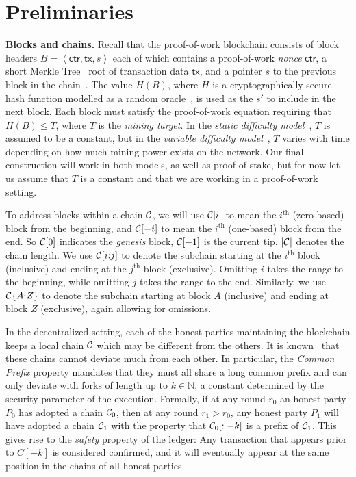 \section{Preliminaries}

\noindent
\textbf{Blocks and chains.}
Recall that
the proof-of-work blockchain consists of block headers $B = \left<\textsf{ctr}, \textsf{tx}, s\right>$ each of
which contains a proof-of-work \emph{nonce} $\textsf{ctr}$, a short Merkle Tree~\cite{merkle}
root of transaction
data $\textsf{tx}$, and a pointer $s$ to the previous block in the chain~\cite{backbone}. The value $H(B)$, where
$H$ is a cryptographically secure hash function modelled as a random oracle~\cite{ro}, is used as the $s'$
to include in the next block. Each block must satisfy the proof-of-work equation requiring that
$H(B) \leq T$, where $T$ is the \emph{mining target}. In the \emph{static difficulty model}~\cite{backbone,backbone-new},
$T$ is assumed to be a constant, but in the \emph{variable difficulty model}~\cite{varbackbone}, $T$ varies with
time depending on how much mining power exists on the network. Our final construction will work
in both models, as well as proof-of-stake, but for now let us assume that $T$ is a constant and
that we are working in a proof-of-work setting.

To address blocks within a chain $\mathcal{C}$, we will use $\mathcal{C}[i]$ to mean the $i^\text{th}$ (zero-based)
block from the beginning, and $\mathcal{C}[-i]$ to mean the $i^\text{th}$ (one-based) block from the end.
So $\mathcal{C}[0]$ indicates the \emph{genesis} block, $\mathcal{C}[-1]$ is the current tip.
$|\mathcal{C}|$ denotes the chain length. We use $\mathcal{C}[i{:}j]$
to denote the subchain starting at the $i^\text{th}$ block (inclusive) and ending at the $j^\text{th}$
block (exclusive).
Omitting $i$ takes the range to the beginning, while
omitting $j$ takes the range to the end.
Similarly, we use $\mathcal{C}\{A{:}Z\}$ to denote the subchain starting at block $A$
(inclusive) and ending at block $Z$ (exclusive), again allowing for omissions.

In the decentralized setting, each of the honest parties maintaining the blockchain keeps a local
chain $\mathcal{C}$ which may be different from the others. It is known~\cite{backbone} that these chains
cannot deviate much from each other. In particular, the \emph{Common Prefix} property mandates
that they must all share a long common prefix and can only deviate with forks of length up
to $k \in \mathbb{N}$, a constant determined by the security parameter of the execution.
Formally, if at any round $r_0$ an honest party $P_0$ has adopted a chain $\mathcal{C}_0$, then
at any round $r_1 > r_0$, any honest party $P_1$ will have adopted a chain $\mathcal{C}_1$
with the property that $\mathcal{C}_0[:-k]$ is a prefix of $\mathcal{C}_1$.
This gives rise to the \emph{safety} property of the ledger: Any transaction that appears
prior to $C[-k]$ is considered confirmed, and it will eventually appear at the same position
in the chains of all honest parties.

